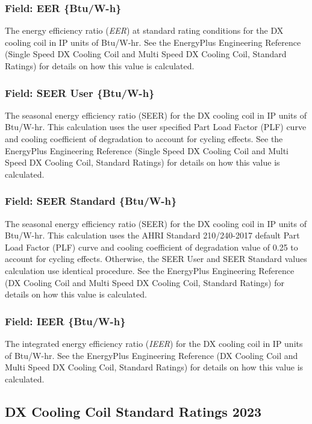 \subsubsection{Field: EER \{Btu/W-h\}}

The energy efficiency ratio (\emph{EER}) at standard rating conditions for the DX cooling coil in IP units of Btu/W-hr. See the EnergyPlus Engineering Reference (Single Speed DX Cooling Coil and Multi Speed DX Cooling Coil, Standard Ratings) for details on how this value is calculated.

\subsubsection{Field: SEER User \{Btu/W-h\}}

The seasonal energy efficiency ratio (SEER) for the DX cooling coil in IP units of Btu/W-hr. This calculation uses the user specified Part Load Factor (PLF) curve and cooling coefficient of degradation to account for cycling effects. See the EnergyPlus Engineering Reference (Single Speed DX Cooling Coil and Multi Speed DX Cooling Coil, Standard Ratings) for details on how this value is calculated.

\subsubsection{Field: SEER Standard \{Btu/W-h\}}

The seasonal energy efficiency ratio (SEER) for the DX cooling coil in IP units of Btu/W-hr. This calculation uses the AHRI Standard 210/240-2017 default Part Load Factor (PLF) curve and cooling coefficient of degradation value of 0.25 to account for cycling effects. Otherwise, the SEER User and SEER Standard values calculation use identical procedure. See the EnergyPlus Engineering Reference (DX Cooling Coil and Multi Speed DX Cooling Coil, Standard Ratings) for details on how this value is calculated.

\subsubsection{Field: IEER \{Btu/W-h\}}

The integrated energy efficiency ratio (\emph{IEER}) for the DX cooling coil in IP units of Btu/W-hr. See the EnergyPlus Engineering Reference (DX Cooling Coil and Multi Speed DX Cooling Coil, Standard Ratings) for details on how this value is calculated.

\subsection{DX Cooling Coil Standard Ratings 2023}\label{dx-cooling-coil-standard-ratings-2023}

